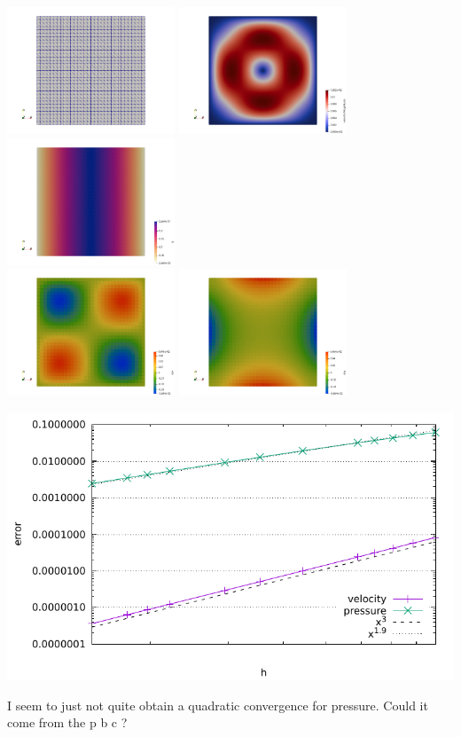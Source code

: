 \begin{center}
\includegraphics[width=5cm]{python_codes/fieldstone_46/results/grid}
\includegraphics[width=5cm]{python_codes/fieldstone_46/results/vel}
\includegraphics[width=5cm]{python_codes/fieldstone_46/results/press}\\
\includegraphics[width=5cm]{python_codes/fieldstone_46/results/exx}
\includegraphics[width=5cm]{python_codes/fieldstone_46/results/exy}
\end{center}

\begin{center}
\includegraphics[width=14cm]{python_codes/fieldstone_46/results/errors.pdf}
\end{center}

I seem to just not quite obtain a quadratic convergence for pressure. Could it come 
from the p b c ?
